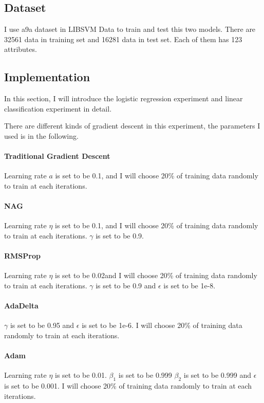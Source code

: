 \documentclass[journal, a4paper]{IEEEtran}
\begin{document}
\subsection{Dataset}
I use a9a dataset in LIBSVM Data to train and test this two models. There are 32561 data in training set and 16281 data in test set. Each of them has 123 attributes.

\subsection{Implementation}
In this section, I will introduce the logistic regression experiment and linear classification experiment in detail.

There are different kinds of gradient descent in this experiment, the parameters I used is in the following.

\paragraph{Traditional Gradient Descent} Learning rate $a$ is set to be 0.1, and I will choose 20\% of training data randomly to train at each iterations.

\paragraph{NAG} Learning rate $\eta$ is set to be 0.1, and I will choose 20\% of training data randomly to train at each iterations. $\gamma$ is set to be 0.9.

\paragraph{RMSProp} Learning rate $\eta$ is set to be 0.02and I will choose 20\% of training data randomly to train at each iterations. $\gamma$ is set to be 0.9 and $\epsilon$ is set to be 1e-8.

\paragraph{AdaDelta} $\gamma$ is set to be 0.95 and $\epsilon$ is set to be 1e-6. I will choose 20\% of training data randomly to train at each iterations.

\paragraph{Adam} Learning rate $\eta$ is set to be 0.01. $\beta_1$ is set to be 0.999 $\beta_2$ is set to be 0.999 and $\epsilon$ is set to be 0.001. I will choose 20\% of training data randomly to train at each iterations.
\end{document}

